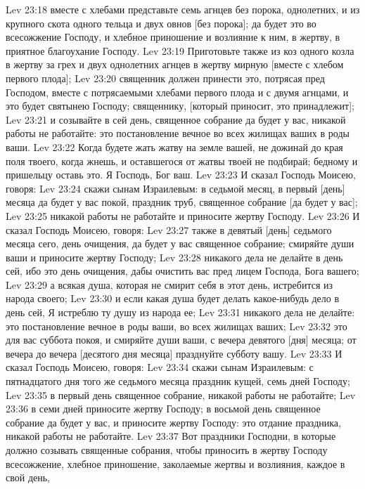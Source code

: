 \vs Lev 23:18 вместе с хлебами представьте семь агнцев без порока, однолетних, и из крупного скота одного тельца и двух овнов [без порока]; да будет это во всесожжение Господу, и хлебное приношение и возлияние к ним, в жертву, в приятное благоухание Господу.
\vs Lev 23:19 Приготовьте также из  коз одного козла в жертву за грех и двух однолетних агнцев в жертву мирную [вместе с хлебом первого плода];
\vs Lev 23:20 священник должен принести это, потрясая пред Господом, вместе с потрясаемыми хлебами первого плода и с двумя агнцами, и это будет святынею Господу; священнику, [который приносит, это принадлежит];
\vs Lev 23:21 и созывайте  в сей день, священное собрание да будет у вас, никакой работы не работайте: это постановление вечное во всех жилищах ваших в роды ваши.
\vs Lev 23:22 Когда будете жать жатву на земле вашей, не дожинай до края поля твоего, когда жнешь, и оставшегося от жатвы твоей не подбирай; бедному и пришельцу оставь это. Я Господь, Бог ваш.
\rsbpar\vs Lev 23:23 И сказал Господь Моисею, говоря:
\vs Lev 23:24 скажи сынам Израилевым: в седьмой месяц, в первый [день] месяца да будет у вас покой, праздник труб, священное собрание [да будет у вас];
\vs Lev 23:25 никакой работы не работайте и приносите жертву Господу.
\rsbpar\vs Lev 23:26 И сказал Господь Моисею, говоря:
\vs Lev 23:27 также в девятый [день] седьмого месяца сего, день очищения, да будет у вас священное собрание; смиряйте души ваши и приносите жертву Господу;
\vs Lev 23:28 никакого дела не делайте в день сей, ибо это день очищения, дабы очистить вас пред лицем Господа, Бога вашего;
\vs Lev 23:29 а всякая душа, которая не смирит себя в этот день, истребится из народа своего;
\vs Lev 23:30 и если какая душа будет делать какое-нибудь дело в день сей, Я истреблю ту душу из народа ее;
\vs Lev 23:31 никакого дела не делайте: это постановление вечное в роды ваши, во всех жилищах ваших;
\vs Lev 23:32 это для вас суббота покоя, и смиряйте души ваши, с вечера девятого [дня] месяца; от вечера до вечера [десятого дня месяца] празднуйте субботу вашу.
\rsbpar\vs Lev 23:33 И сказал Господь Моисею, говоря:
\vs Lev 23:34 скажи сынам Израилевым: с пятнадцатого дня того же седьмого месяца праздник кущей, семь дней Господу;
\vs Lev 23:35 в первый день священное собрание, никакой работы не работайте;
\vs Lev 23:36 в  семи дней приносите жертву Господу; в восьмой день священное собрание да будет у вас, и приносите жертву Господу: это отдание праздника, никакой работы не работайте.
\vs Lev 23:37 Вот праздники Господни, в которые должно созывать священные собрания, чтобы приносить в жертву Господу всесожжение, хлебное приношение, заколаемые жертвы и возлияния, каждое в свой день,
